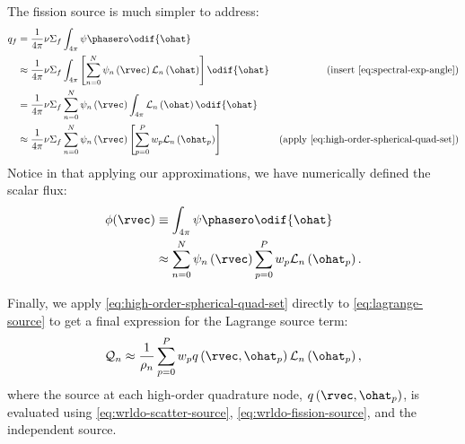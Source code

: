 The fission source is much simpler to address:
\begin{equation}
  \label{eq:wrldo-fission-source}
  \begin{aligned}
    q_f & =\frac{1}{4\pi}\nu\Sigma_f\int_{4\pi}\psi\phasero\odif{\ohat}                                                                                                                                      \\
        & \approx \frac{1}{4\pi}\nu\Sigma_f \int_{4\pi}\left[\sum_{n=0}^N\psi_n\left(\rvec\right)\mathcal{L}_n\left(\ohat\right)\right]\odif{\ohat} & \text{(insert \cref{eq:spectral-exp-angle})}           \\
        & =\frac{1}{4\pi}\nu\Sigma_f \sum_{n=0}^N\psi_n\left(\rvec\right)\int_{4\pi}\mathcal{L}_n\left(\ohat\right)\odif{\ohat}                                                                              \\
        & \approx \frac{1}{4\pi}\nu\Sigma_f \sum_{n=0}^N \psi_n\left(\rvec\right)\left[\sum_{p=0}^P w_p\mathcal{L}_n\left(\ohat_p\right) \right]    & \text{(apply \cref{eq:high-order-spherical-quad-set})} \\
  \end{aligned}
\end{equation}
Notice in that applying our approximations, we have numerically defined the scalar flux:
\begin{equation}
  \label{eq:numerical-scalar-flux}
  \begin{split}
    \phi(\rvec) & \equiv\int_{4\pi}\psi\phasero\odif{\ohat}                                                         \\
                & \approx \sum_{n=0}^{N}\psi_n\left(\rvec\right)\sum_{p=0}^{P}w_p\mathcal{L}_n\left(\ohat_p\right).
  \end{split}
\end{equation}

Finally, we apply \cref{eq:high-order-spherical-quad-set} directly to \cref{eq:lagrange-source} to get a final expression for the Lagrange source term:
\begin{equation}
  \label{eq:discrete-lagrange-source}
  \mathcal{Q}_n \approx \frac{1}{\rho_n}\sum_{p=0}^{P}w_p q\left(\rvec,\ohat_p\right)\mathcal{L}_n\left(\ohat_p\right),
\end{equation}
where the source at each high-order quadrature node, $q\left(\rvec,\ohat_p\right)$, is evaluated using \cref{eq:wrldo-scatter-source}, \cref{eq:wrldo-fission-source}, and the independent source.

